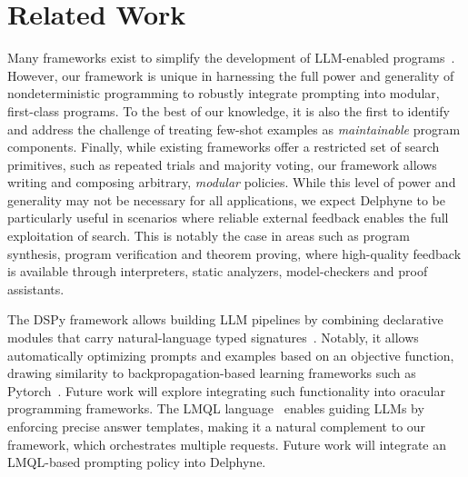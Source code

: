 \section{Related Work}
\label{sec:related-work}

Many frameworks exist to simplify the development of LLM-enabled programs~\cite{liu2023prompting}. However, our framework is unique in harnessing the full power and generality of nondeterministic programming to robustly integrate prompting into modular, first-class programs. To the best of our knowledge, it is also the first to identify and address the challenge of treating few-shot examples as \emph{maintainable} program components. Finally, while existing frameworks offer a restricted set of search primitives, such as repeated trials and majority voting, our framework allows writing and composing arbitrary, \emph{modular} policies. While this level of power and generality may not be necessary for all applications, we expect Delphyne to be particularly useful in scenarios where reliable external feedback enables the full exploitation of search. This is notably the case in areas such as program synthesis, program verification and theorem proving, where high-quality feedback is available through interpreters, static analyzers, model-checkers and proof assistants.

The DSPy framework allows building LLM pipelines by combining declarative modules that carry natural-language typed signatures~\cite{khattab2024dspy}. Notably, it allows automatically optimizing prompts and examples based on an objective function, drawing similarity to backpropagation-based learning frameworks such as Pytorch~\cite{paszke2019pytorch}. Future work will explore integrating such functionality into oracular programming frameworks. The LMQL language~\cite{beurer2023prompting} enables guiding LLMs by enforcing precise answer templates, making it a natural complement to our framework, which orchestrates multiple requests. Future work will integrate an LMQL-based prompting policy into Delphyne.
